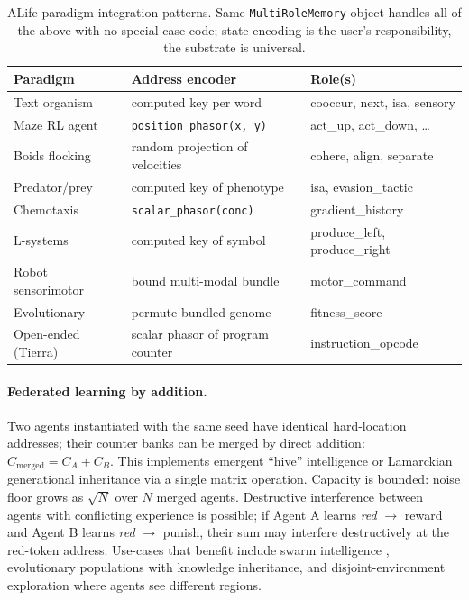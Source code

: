 \documentclass[11pt,a4paper]{article}
\begin{document}
\begin{table}[t]
  \centering
  \caption{ALife paradigm integration patterns.  Same
  \texttt{MultiRoleMemory} object handles all of the above with no
  special-case code;  state encoding is the user's responsibility, the
  substrate is universal.}
  \label{tab:alife}
  \begin{tabular}{lll}
    \toprule
    Paradigm & Address encoder & Role(s) \\
    \midrule
    Text organism      & computed key per word              & cooccur, next, isa, sensory \\
    Maze RL agent      & \texttt{position\_phasor(x, y)}    & act\_up, act\_down, \ldots \\
    Boids flocking     & random projection of velocities   & cohere, align, separate \\
    Predator/prey      & computed key of phenotype          & isa, evasion\_tactic \\
    Chemotaxis         & \texttt{scalar\_phasor(conc)}      & gradient\_history \\
    L-systems          & computed key of symbol             & produce\_left, produce\_right \\
    Robot sensorimotor & bound multi-modal bundle           & motor\_command \\
    Evolutionary       & permute-bundled genome             & fitness\_score \\
    Open-ended (Tierra)& scalar phasor of program counter  & instruction\_opcode \\
    \bottomrule
  \end{tabular}
\end{table}

\paragraph{Federated learning by addition.}
Two agents instantiated with the same seed have identical hard-location
addresses;  their counter banks can be merged by direct addition:
$C_{\mathrm{merged}} = C_A + C_B$.  This implements emergent ``hive''
intelligence or Lamarckian generational inheritance via a single matrix
operation.  Capacity is bounded:  noise floor grows as $\sqrt{N}$ over
$N$ merged agents.  Destructive interference between agents with
conflicting experience is possible;  if Agent A learns
\textit{red} $\to$ reward and Agent B learns \textit{red} $\to$ punish,
their sum may interfere destructively at the red-token address.
Use-cases that benefit include swarm intelligence
\cite{indiveri2011neuromorphic,davies2018loihi}, evolutionary
populations with knowledge inheritance, and disjoint-environment
exploration where agents see different regions.
\end{document}
